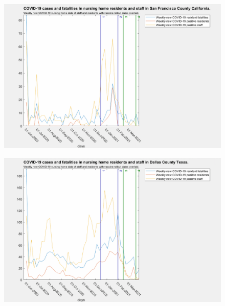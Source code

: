 \documentclass[twoside]{article}
\begin{document}
\begin{multicols}{2}
\begin{figure}[H]
	\includegraphics[width=\linewidth]{images/sanfrancisco_nursing_home_with_vaccine.png}
	\caption{}
	\label{fig:images/sanfrancisco_nursing_home_with_vaccineLabel}
\end{figure}

\begin{figure}[H]
	\includegraphics[width=\linewidth]{images/dallas_nursing_home_with_vaccine.png}
	\caption{}
	\label{fig:images/dallas_nursing_home_with_vaccineLabel}
\end{figure}


\end{multicols}
\end{document}
